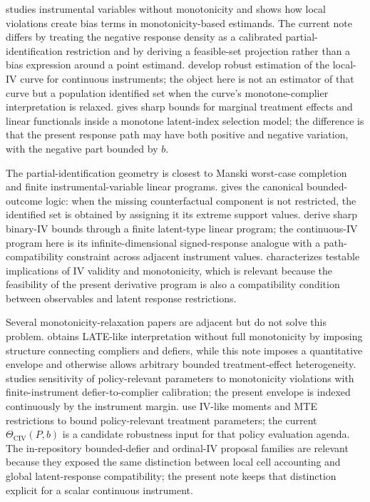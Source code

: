 \documentclass[11pt]{article}
\theoremstyle{definition}
\theoremstyle{plain}
\theoremstyle{remark}
\begin{document}
\cite{Klein2010} studies instrumental variables without monotonicity and shows
how local violations create bias terms in monotonicity-based estimands.  The
current note differs by treating the negative response density as a calibrated
partial-identification restriction and by deriving a feasible-set projection
rather than a bias expression around a point estimand.  \cite{KennedyLorchSmall2019}
develop robust estimation of the local-IV curve for continuous instruments; the
object here is not an estimator of that curve but a population identified set
when the curve's monotone-complier interpretation is relaxed.  \cite{Marx2024}
gives sharp bounds for marginal treatment effects and linear functionals inside
a monotone latent-index selection model; the difference is that the present
response path may have both positive and negative variation, with the negative
part bounded by \(b\).

The partial-identification geometry is closest to Manski worst-case completion
and finite instrumental-variable linear programs.  \cite{Manski1990} gives the
canonical bounded-outcome logic: when the missing counterfactual component is
not restricted, the identified set is obtained by assigning it its extreme
support values.  \cite{BalkePearl1997} derive sharp binary-IV bounds through a
finite latent-type linear program; the continuous-IV program here is its
infinite-dimensional signed-response analogue with a path-compatibility
constraint across adjacent instrument values.  \cite{Kitagawa2015} characterizes
testable implications of IV validity and monotonicity, which is relevant because
the feasibility of the present derivative program is also a compatibility
condition between observables and latent response restrictions.

Several monotonicity-relaxation papers are adjacent but do not solve this
problem.  \cite{DeChaisemartin2017} obtains LATE-like interpretation without
full monotonicity by imposing structure connecting compliers and defiers, while
this note imposes a quantitative envelope and otherwise allows arbitrary
bounded treatment-effect heterogeneity.  \cite{Yap2022} studies sensitivity of
policy-relevant parameters to monotonicity violations with finite-instrument
defier-to-complier calibration; the present envelope is indexed continuously by
the instrument margin.  \cite{MogstadSantosTorgovitsky2018} use IV-like moments
and MTE restrictions to bound policy-relevant treatment parameters; the current
\(\Theta_{\mathrm{CIV}}(P,b)\) is a candidate robustness input for that policy
evaluation agenda.  The in-repository bounded-defier and ordinal-IV proposal
families are relevant because they exposed the same distinction between local
cell accounting and global latent-response compatibility; the present note
keeps that distinction explicit for a scalar continuous instrument.
\end{document}
